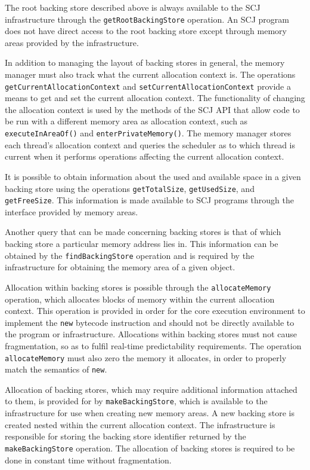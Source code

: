 \documentclass[a4paper,10pt]{article}
\begin{document}
The root backing store described above is always available to the SCJ
infrastructure through the \texttt{get\-Root\-Backing\-Store} operation. An SCJ
program does not have direct access to the root backing store except through
memory areas provided by the infrastructure.

In addition to managing the layout of backing stores in general, the memory
manager must also track what the current allocation context is. The operations
\texttt{get\-Cur\-rent\-Allo\-cation\-Con\-text} and
\texttt{set\-Cur\-rent\-Allo\-cation\-Con\-text} provide a means to get and set the
current allocation context. The functionality of changing the allocation context
is used by the methods of the SCJ API that allow code to be run with a different
memory area as allocation context, such as \texttt{execute\-In\-Area\-Of()} and
\texttt{enter\-Private\-Memory()}. The memory manager stores each thread's
allocation context and queries the scheduler as to which thread is current when
it performs operations affecting the current allocation context.

It is possible to obtain information about the used and available space in a given
backing store using the operations \texttt{get\-Total\-Size},
\texttt{get\-Used\-Size}, and \texttt{get\-Free\-Size}. This information is made
available to SCJ programs through the interface provided by memory areas.

Another query that can be made concerning backing stores is that of which
backing store a particular memory address lies in. This information can be
obtained by the \texttt{find\-Backing\-Store} operation and is required by the
infrastructure for obtaining the memory area of a given object.

Allocation within backing stores is possible through the
\texttt{allo\-cate\-Memory} operation, which allocates blocks of memory within
the current allocation context. This operation is provided in order for the core
execution environment to implement the \texttt{new} bytecode instruction and
should not be directly available to the program or infrastructure. Allocations
within backing stores must not cause fragmentation, so as to fulfil real-time
predictability requirements. The operation \texttt{allo\-cate\-Memory} must also
zero the memory it allocates, in order to properly match the semantics of
\texttt{new}.
 
Allocation of backing stores, which may require additional information attached
to them, is provided for by \texttt{make\-Back\-ing\-Store}, which is available
to the infrastructure for use when creating new memory areas. A new backing
store is created nested within the current allocation context. The
infrastructure is responsible for storing the backing store identifier returned
by the \texttt{make\-Backing\-Store} operation. The allocation of backing stores
is required to be done in constant time without fragmentation.
\end{document}
